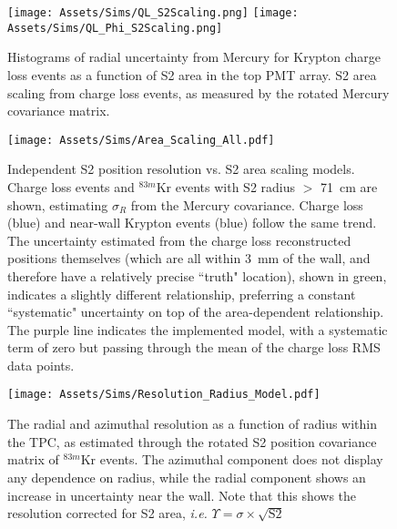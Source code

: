 \begin{figure}
    \centering
    \texttt{[image: Assets/Sims/QL\_S2Scaling.png]}
    \texttt{[image: Assets/Sims/QL\_Phi\_S2Scaling.png]}
    \caption[Histograms of radial uncertainty from Mercury for Krypton charge loss events as a function of S2 area in the top PMT array. ]%
    {Histograms of radial uncertainty from Mercury for Krypton charge loss events as a function of S2 area in the top PMT array. 
    S2 area scaling from charge loss events, as measured by the rotated Mercury covariance matrix.
}
    \label{fig:ql_area_scaling}
\end{figure}

\begin{figure}
    \centering
    \texttt{[image: Assets/Sims/Area\_Scaling\_All.pdf]}
    \caption[Independent S2 position resolution vs. S2 area scaling models.]%
    {Independent S2 position resolution vs. S2 area scaling models.
    Charge loss events and $^{83m}$Kr events with S2 radius $>$ 71~cm are shown, estimating $\sigma_R$ from the Mercury covariance.
    Charge loss (blue) and near-wall Krypton events (blue) follow the same trend.
    The uncertainty estimated from the charge loss reconstructed positions themselves (which are all within 3~mm of the wall, and therefore have a relatively precise ``truth" location), 
    shown in green, indicates a slightly different relationship, preferring a constant ``systematic" uncertainty on top of the area-dependent relationship.
    The purple line indicates the implemented model, with a systematic term of zero but passing through the mean of the charge loss RMS data points.
    }
    \label{fig:resolution_area_scaling}
\end{figure}

\begin{figure}
    \centering
    \texttt{[image: Assets/Sims/Resolution\_Radius\_Model.pdf]}
    \caption[The radial and azimuthal resolution as a function of radius within the TPC, as estimated through the rotated S2 position covariance matrix of $^{83m}$Kr events.]%
    {The radial and azimuthal resolution as a function of radius within the TPC, as estimated through the rotated S2 position covariance matrix of $^{83m}$Kr events.
    The azimuthal component does not display any dependence on radius, while the radial component shows an increase in uncertainty near the wall.
    Note that this shows the resolution corrected for S2 area, \textit{i.e.} $\Upsilon=\sigma\times \sqrt{\mathrm{S2}}$}
    \label{fig:resolution_radius}
\end{figure}
